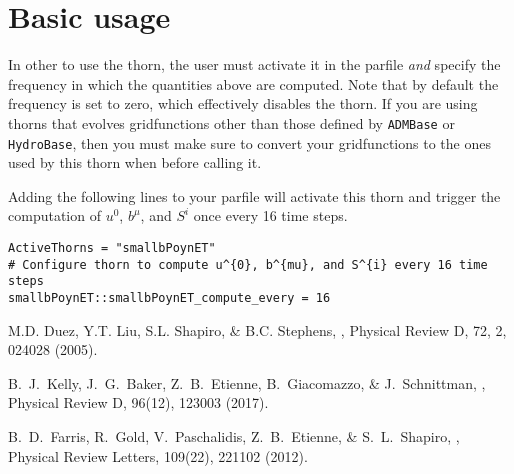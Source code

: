 \section{Basic usage}
\label{sec:basic_usage}

In other to use the \thornname thorn, the user must activate it in the
parfile \emph{and} specify the frequency in which the quantities above
are computed. Note that by default the frequency is set to zero, which
effectively disables the thorn. If you are using thorns that evolves
gridfunctions other than those defined by \texttt{ADMBase} or
\texttt{HydroBase}, then you must make sure to convert your
gridfunctions to the ones used by this thorn when before calling it.

Adding the following lines to your parfile will activate this thorn and
trigger the computation of $u^{0}$, $b^{\mu}$, and $S^{i}$ once every 16
time steps.

\begin{verbatim}
ActiveThorns = "smallbPoynET"
# Configure thorn to compute u^{0}, b^{mu}, and S^{i} every 16 time steps
smallbPoynET::smallbPoynET_compute_every = 16
\end{verbatim}

\begin{thebibliography}{3}

  M.D. Duez, Y.T. Liu, S.L. Shapiro, \& B.C. Stephens,
  ,
  Physical Review D, 72, 2, 024028 (2005).

  B.~J.~Kelly, J.~G.~Baker, Z.~B.~Etienne, B.~Giacomazzo, \& J.~Schnittman, 
  ,
  Physical Review D, 96(12), 123003 (2017).

  B.~D.~Farris, R.~Gold, V.~Paschalidis, Z.~B.~Etienne, \& S.~L.~Shapiro,
  ,
  Physical Review Letters, 109(22), 221102 (2012).

\end{thebibliography}




